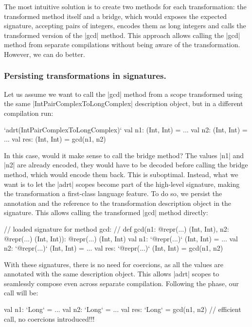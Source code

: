The most intuitive solution is to create two methods for each transformation: the transformed method itself and a bridge, which would exposes the expected signature, accepting pairs of integers, encodes them as long integers and calls the transformed version of the |gcd| method. This approach allows calling the |gcd| method from separate compilations without being aware of the transformation. However, we can do better.

\subsubsection{Persisting transformations in signatures.} Let us assume we want to call the |gcd| method from a scope transformed using the same |IntPairComplexToLongComplex| description object, but in a different compilation run:

\begin{lstlisting-nobreak}
`adrt(IntPairComplexToLongComplex)` {
  val n1: (Int, Int) = ...
  val n2: (Int, Int) = ...
  val res: (Int, Int) = gcd(n1, n2)
}
\end{lstlisting-nobreak}

In this case, would it make sense to call the bridge method? The values |n1| and |n2| are already encoded, they would have to be decoded before calling the bridge method, which would encode them back. This is suboptimal. Instead, what we want is to let the |adrt| scopes become part of the high-level signature, making the transformation a first-class language feature. To do so, we persist the annotation and the reference to the transformation description object in the signature. This allows calling the transformed |gcd| method directly:

\begin{lstlisting-nobreak}
// loaded signature for method gcd:
//  def gcd(n1: @repr(...) (Int, Int), n2: @repr(...) (Int, Int)): @repr(...) (Int, Int)
val n1: `@repr(...)` (Int, Int) = ...
val n2: `@repr(...)` (Int, Int) = ...
val res: `@repr(...)` (Int, Int) = gcd(n1, n2)
\end{lstlisting-nobreak}

With these signatures, there is no need for coercions, as all the values are annotated with the same description object. This allows |adrt| scopes to seamlessly compose even across separate compilation. Following the \commit{} phase, our call will be:

\begin{lstlisting-nobreak}
val n1: `Long` = ...
val n2: `Long` = ...
val res: `Long` = gcd(n1, n2) // efficient call, no coercions introduced!!!
\end{lstlisting-nobreak}

